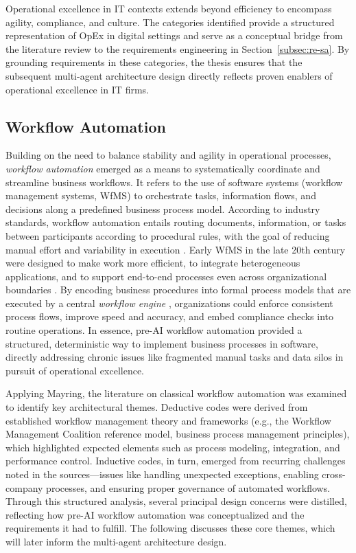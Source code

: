 Operational excellence in IT contexts extends beyond efficiency to encompass agility, compliance, and culture. The categories identified provide a structured representation of OpEx in digital settings and serve as a conceptual bridge from the literature review to the requirements engineering in Section~\ref{subsec:re-sa}. By grounding requirements in these categories, the thesis ensures that the subsequent multi-agent architecture design directly reflects proven enablers of operational excellence in IT firms.

\subsection{Workflow Automation}\label{subsec:workflow-auto}
Building on the need to balance stability and agility in operational processes, \textit{workflow automation} emerged as a means to systematically coordinate and streamline business workflows. It refers to the use of software systems (workflow management systems, WfMS) to orchestrate tasks, information flows, and decisions along a predefined business process model. According to industry standards, workflow automation entails routing documents, information, or tasks between participants according to procedural rules, with the goal of reducing manual effort and variability in execution \parencite{basuResearch2002}. Early WfMS in the late 20th century were designed to make work more efficient, to integrate heterogeneous applications, and to support end-to-end processes even across organizational boundaries \parencite{stohrWorkflow2001}. By encoding business procedures into formal process models that are executed by a central \textit{workflow engine} \parencite{basuResearch2002}, organizations could enforce consistent process flows, improve speed and accuracy, and embed compliance checks into routine operations. In essence, pre-AI workflow automation provided a structured, deterministic way to implement business processes in software, directly addressing chronic issues like fragmented manual tasks and data silos in pursuit of operational excellence.

Applying Mayring, the literature on classical workflow automation was examined to identify key architectural themes. Deductive codes were derived from established workflow management theory and frameworks (e.g., the Workflow Management Coalition reference model, business process management principles), which highlighted expected elements such as process modeling, integration, and performance control. Inductive codes, in turn, emerged from recurring challenges noted in the sources—issues like handling unexpected exceptions, enabling cross-company processes, and ensuring proper governance of automated workflows. Through this structured analysis, several principal design concerns were distilled, reflecting how pre-AI workflow automation was conceptualized and the requirements it had to fulfill. The following discusses these core themes, which will later inform the multi-agent architecture design.

